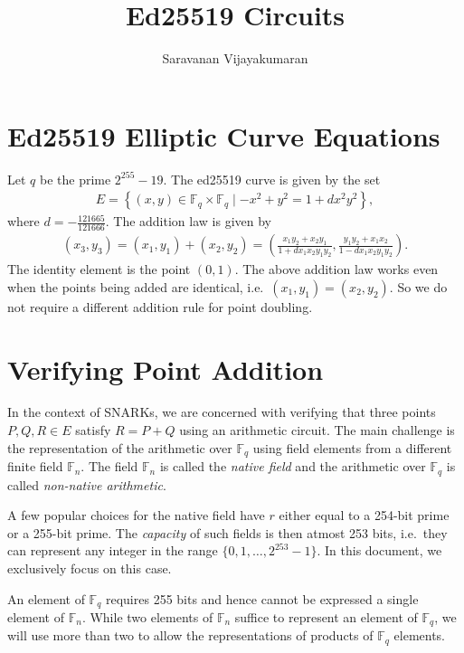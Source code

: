 \documentclass[a4paper, 12pt]{article}
\title{Ed25519 Circuits}
\author{Saravanan Vijayakumaran}
\begin{document}
\maketitle

\section{Ed25519 Elliptic Curve Equations}%
\label{sec:curve_equations}
Let $q$ be the prime $2^{255}-19$. The ed25519 curve is given by the set
\begin{align}
  E = \left\{ (x,y) \in \mathbb{F}_q \times \mathbb{F}_q \mid -x^2+y^2=1+dx^2y^2 \right\},
  \label{eqn:curve}
\end{align}
where $d = -\frac{121665}{121666}$. The addition law is given by
\begin{align}
  (x_3, y_3) = (x_1, y_1) + (x_2, y_2) = \left( \frac{x_1y_2+x_2y_1}{1+dx_1x_2y_1y_2}, \frac{y_1y_2 + x_1x_2}{1-dx_1x_2y_1y_2}  \right).
  \label{eqn:addition}
\end{align}
The identity element is the point $(0,1)$. The above addition law works even when the points being added are identical, i.e.~$(x_1, y_1) = (x_2, y_2)$. So we do not require a different addition rule for point doubling.

\section{Verifying Point Addition}%
\label{sec:verifying_point_addition}
In the context of SNARKs, we are concerned with verifying that three points $P, Q, R \in E$ satisfy $R= P+Q$ using an arithmetic circuit. The main challenge is the representation of the arithmetic over $\mathbb{F}_q$ using field elements from a different finite field $\mathbb{F}_n$. The field $\mathbb{F}_n$ is called the \textit{native field} and the arithmetic over $\mathbb{F}_q$ is called \textit{non-native arithmetic}.

A few popular choices for the native field have $r$ either equal to a 254-bit prime or a 255-bit prime. The \textit{capacity} of such fields is then atmost 253 bits, i.e.~they can represent any integer in the range $\{0,1,\ldots,2^{253}-1\}$. In this document, we exclusively focus on this case.

An element of $\mathbb{F}_q$ requires 255 bits and hence cannot be expressed a single element of $\mathbb{F}_n$. While two elements of $\mathbb{F}_n$ suffice to represent an element of $\mathbb{F}_q$, we will use more than two to allow the representations of products of $\mathbb{F}_q$ elements.
\end{document}
